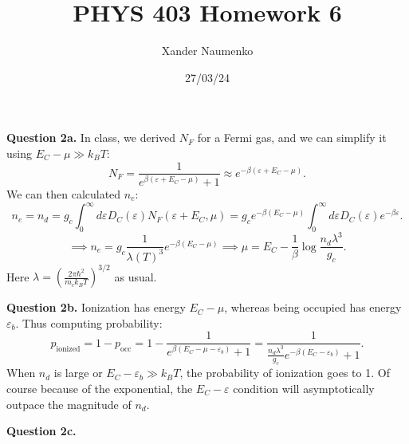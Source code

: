 \documentclass[letterpaper, reqno,11pt]{article}
\begin{document}
\title{PHYS 403 Homework 6}
\date{27/03/24}
\author{Xander Naumenko}
\maketitle

{\medskip\noindent\bf Question 2a.} In class, we derived $N_F$ for a Fermi gas, and we can simplify it using $E_C-\mu \gg k_BT$:
\[
N_F= \frac{1}{e^{\beta\left( \varepsilon+E_C-\mu \right) }+1}\approx e^{-\beta\left( \varepsilon+E_C-\mu \right) }
.\]
We can then calculated $n_e$:
\[
n_e=n_d=g_c\int_0^{\infty}d\varepsilon D_C(\varepsilon) N_F\left( \varepsilon+E_C, \mu \right)=g_c e^{-\beta\left( E_C-\mu \right) }\int_0^{\infty} d\varepsilon D_C(\varepsilon) e^{-\beta\varepsilon}
.\]
\[
\implies n_e=g_c\frac{1}{\lambda(T)^{3}}e^{-\beta\left( E_C-\mu \right) }\implies \mu=E_C-\frac{1}{\beta}\log \frac{n_d\lambda^3}{g_c}
.\]
Here $\lambda=\left( \frac{2\pi\hbar^2}{m_c k_BT} \right) ^{3 /2}$ as usual.

{\medskip\noindent\bf Question 2b.} Ionization has energy $E_C-\mu$, whereas being occupied has energy $\varepsilon_b$. Thus computing probability:
\[
p_{\text{ionized}}= 1-p_{\text{occ}}=1-\frac{1}{e^{\beta\left( E_C-\mu-\varepsilon_b \right) }+1}=\frac{1}{\frac{n_d\lambda^3}{g_c}e^{-\beta\left( E_C-\varepsilon_b \right) }+1}
.\]
When $n_d$ is large or $E_C-\varepsilon_b \gg k_BT$, the probability of ionization goes to 1. Of course because of the exponential, the $E_C-\varepsilon$ condition will asymptotically outpace the magnitude of $n_d$.

{\medskip\noindent\bf Question 2c.} 
\end{document}
